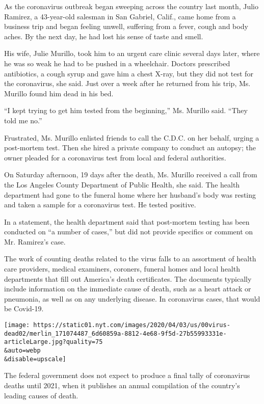 As the coronavirus outbreak began sweeping across the country last
month, Julio Ramirez, a 43-year-old salesman in San Gabriel, Calif.,
came home from a business trip and began feeling unwell, suffering from
a fever, cough and body aches. By the next day, he had lost his sense of
taste and smell.

His wife, Julie Murillo, took him to an urgent care clinic several days
later, where he was so weak he had to be pushed in a wheelchair. Doctors
prescribed antibiotics, a cough syrup and gave him a chest X-ray, but
they did not test for the coronavirus, she said. Just over a week after
he returned from his trip, Ms. Murillo found him dead in his bed.

``I kept trying to get him tested from the beginning,'' Ms. Murillo
said. ``They told me no.''

Frustrated, Ms. Murillo enlisted friends to call the C.D.C. on her
behalf, urging a post-mortem test. Then she hired a private company to
conduct an autopsy; the owner pleaded for a coronavirus test from local
and federal authorities.

On Saturday afternoon, 19 days after the death, Ms. Murillo received a
call from the Los Angeles County Department of Public Health, she said.
The health department had gone to the funeral home where her husband's
body was resting and taken a sample for a coronavirus test. He tested
positive.

In a statement, the health department said that post-mortem testing has
been conducted on ``a number of cases,'' but did not provide specifics
or comment on Mr. Ramirez's case.

The work of counting deaths related to the virus falls to an assortment
of health care providers, medical examiners, coroners, funeral homes and
local health departments that fill out America's death certificates. The
documents typically include information on the immediate cause of death,
such as a heart attack or pneumonia, as well as on any underlying
disease. In coronavirus cases, that would be Covid-19.

\texttt{[image: https://static01.nyt.com/images/2020/04/03/us/00virus-dead02/merlin\_171074487\_6d60859a-8812-4e68-9f5d-27b55993331e-articleLarge.jpg?quality=75\\\&auto=webp\\\&disable=upscale]}

The federal government does not expect to produce a final tally of
coronavirus deaths until 2021, when it publishes an annual compilation
of the country's leading causes of death.

